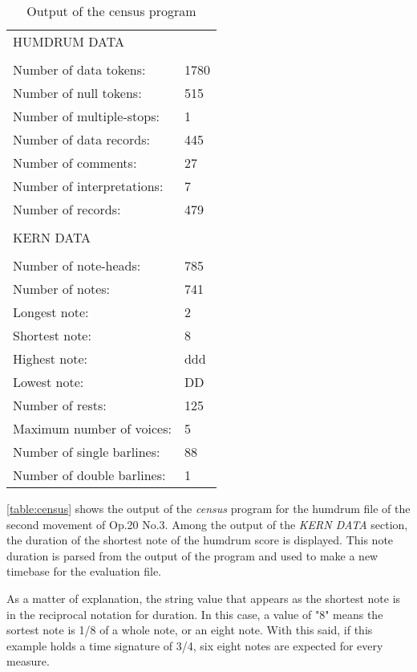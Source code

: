 		\begin{table}[]
		\centering
		\begin{tabular}{ll}
		HUMDRUM DATA &  \\
		 &  \\
		Number of data tokens: & 1780 \\
		Number of null tokens: & 515 \\
		Number of multiple-stops: & 1 \\
		Number of data records: & 445 \\
		Number of comments: & 27 \\
		Number of interpretations: & 7 \\
		Number of records: & 479 \\
		 &  \\
		KERN DATA &  \\
		 &  \\
		Number of note-heads: & 785 \\
		Number of notes: & 741 \\
		Longest note: & 2 \\
		Shortest note: & 8 \\
		Highest note: & ddd \\
		Lowest note: & DD \\
		Number of rests: & 125 \\
		Maximum number of voices: & 5 \\
		Number of single barlines: & 88 \\
		Number of double barlines: & 1
		\end{tabular}
		\caption{Output of the census program}
		\label{table:census}
		\end{table}

		\autoref{table:census} shows the output of the \emph{census} program for the humdrum file of the second movement of Op.20 No.3. Among the output of the \emph{KERN DATA} section, the duration of the shortest note of the humdrum score is displayed. This note duration is parsed from the output of the program and used to make a new timebase for the evaluation file.

		As a matter of explanation, the string value that appears as the shortest note is in the reciprocal notation for duration. In this case, a value of "8" means the sortest note is 1/8 of a whole note, or an eight note. With this said, if this example holds a time signature of 3/4, six eight notes are expected for every measure.


